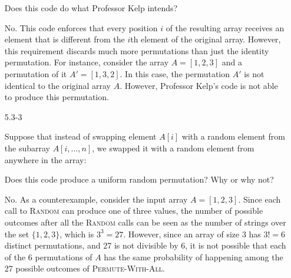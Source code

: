 \begin{enumerate}
{\begin{algorithm}[H]
\SetAlgoNoEnd\DontPrintSemicolon
\BlankLine
{}
\end{algorithm}

Does this code do what Professor Kelp intends?
}

\begin{framed}
No. This code enforces that every position $i$ of the resulting array receives
an element that is different from the $i$th element of the original array.
However, this requirement discards much more permutations than just the identity
permutation. For instance, consider the array $A = [1, 2, 3]$ and a permutation
of it $A' = [1, 3, 2]$. In this case, the permutation $A'$ is not identical
to the original array $A$. However, Professor Kelp's code is not able to produce
this permutation.
\end{framed}

\item[5.3{-}3]{Suppose that instead of swapping element $A[i]$ with a random
element from the subarray $A[i, \dots, n]$, we swapped it with a random element
from anywhere in the array:

\begin{algorithm}[H]
\SetAlgoNoEnd\DontPrintSemicolon
\BlankLine
{}
\end{algorithm}

Does this code produce a uniform random permutation? Why or why not?
}

\begin{framed}
No. As a counterexample, consider the input array $A = [1, 2, 3]$. Since each
call to \textsc{Random} can produce one of three values, the number of possible
outcomes after all the \textsc{Random} calls can be seen as the number of
strings over the set $\{1, 2, 3\}$, which is $3^3 = 27$. However, since an array
of size $3$ has $3! = 6$ distinct permutations, and 27 is not divisible by 6, it
is not possible that each of the 6 permutations of $A$ has the same probability
of happening among the 27 possible outcomes of \textsc{Permute-With-All}.
\end{framed}


\end{enumerate}
